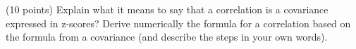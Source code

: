 \documentclass[onecolumn,10pt]{jhwhw}
\begin{document}
\clearpage
{}

(10 points) Explain what it means to say that a correlation is a covariance expressed in z-scores? Derive numerically the formula for a correlation based on the formula from a covariance (and describe the steps in your own words).






\end{document}
